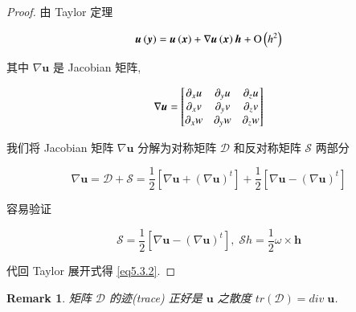\documentclass[11pt]{article}
\newtheorem{remark}{Remark}[subsection]
\begin{document}
\begin{proof}
	
	\kaishu 
	
	由 Taylor 定理
	
	\begin{equation}
	\boldsymbol{u}\left( \boldsymbol{y} \right) = \boldsymbol{u}\left( \boldsymbol{x} \right) + \nabla \boldsymbol{u}\left( \boldsymbol{x} \right)\boldsymbol{h} + {\rm O}\left( {{h^2}} \right)
	\notag 
	\end{equation}
	
	其中 $ \nabla \boldsymbol{u} $ 是 Jacobian 矩阵, 
	
	\begin{equation}
	\nabla \boldsymbol{u} = \left[ {\begin{matrix}
		{{\partial _x}u} & {{\partial _y}u} & {{\partial _z}u}  \\ 
		{{\partial _x}v} & {{\partial _y}v} & {{\partial _z}v}  \\ 
		{{\partial _x}w} & {{\partial _y}w} & {{\partial _z}w}  \\ 
		\end{matrix} } \right]
	\notag 
	\end{equation}
	
	我们将 Jacobian 矩阵 $ \nabla \boldsymbol{u} $ 分解为对称矩阵 $ \mathcal{D} $ 和反对称矩阵 $ \mathcal{S} $ 两部分
	
	\begin{equation}
	\nabla \boldsymbol{u} = \mathcal{D} + \mathcal{S} = \frac{1}{2}\left[ {\nabla \boldsymbol{u} + {{\left( {\nabla \boldsymbol{u}} \right)}^t}} \right] + \frac{1}{2}\left[ {\nabla \boldsymbol{u} - {{\left( {\nabla \boldsymbol{u}} \right)}^t}} \right]
	\label{eq5.3.3}
	\end{equation}
	
	容易验证
	
	\begin{equation}
	\mathcal{S}= \frac{1}{2}\left[ {\nabla \boldsymbol{u}- {{\left( {\nabla \boldsymbol{u}} \right)}^t}} \right],\;\mathcal{S}h = \frac{1}{2}\omega  \times \boldsymbol{h}
	\label{eq5.3.4}
	\end{equation}
	
	代回 Taylor 展开式得 \ref{eq5.3.2}.
	
\end{proof}

\begin{remark}
	矩阵 $ \mathcal{D} $ 的迹(trace) 正好是 $ \boldsymbol{u} $  之散度 $tr\left( \mathcal{D} \right) = div\;\boldsymbol{u}$.
\end{remark}
\end{document}
